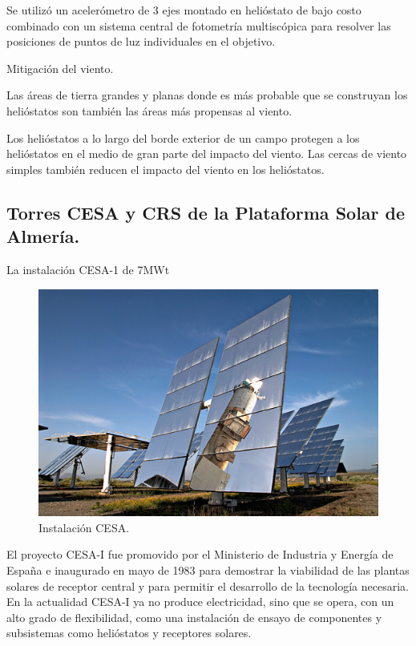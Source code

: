 Se utilizó un acelerómetro de 3 ejes montado en helióstato de bajo costo combinado con un sistema central de fotometría multiscópica para resolver las posiciones de puntos de luz individuales en el objetivo.

Mitigación del viento.

Las áreas de tierra grandes y planas donde es más probable que se construyan los helióstatos son también las áreas más propensas al viento.

Los helióstatos a lo largo del borde exterior de un campo protegen a los helióstatos en el medio de gran parte del impacto del viento. Las cercas de viento simples también reducen el impacto del viento en los helióstatos. \cite{GoogleWebSite}



\subsection{Torres CESA y CRS de la Plataforma Solar de Almería.}

La instalación CESA-1 de 7MWt

\begin{figure}[h!]
  	\centering
	\includegraphics[width=\textwidth]{FotosPaginasWebHeliostatos/unnamed(4).png}
	\caption{Instalación CESA.~\cite{PSA1WebSite}
	\label{fig:FotosPaginasWebHeliostatos/unnamed(4).png}}
\end{figure}

El proyecto CESA-I fue promovido por el Ministerio de Industria y Energía de España e inaugurado en mayo de 1983 para demostrar la viabilidad de las plantas solares de receptor central y para permitir el desarrollo de la tecnología necesaria. En la actualidad CESA-I ya no produce electricidad, sino que se opera, con un alto grado de flexibilidad, como una instalación de ensayo de componentes y subsistemas como helióstatos y receptores solares.

